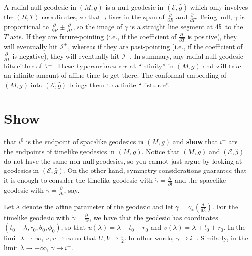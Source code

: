 \documentclass[10pt,a4paper]{exam}
\newcommand{\doit}[1]{{\color{darkgreen}\sffamily\bfseries #1}}
\newcommand{\pder}[2]{\frac{\partial #1}{\partial #2}}
\newcommand{\der}[2]{\frac{d #1}{d #2}}
\newcommand{\scri}{\mathscr{I}}
\newcommand{\esu}{\mathscr{E}}
\begin{document}
\begin{questions}
\begin{parts}
          \begin{solution}
            A radial null geodesic in $(M,g)$ is
            a null geodesic in $(\esu,\hat g)$ which only involves the
            $(R,T)$ coordinates, so that $\dot\gamma$ lives in the
            span of $\pder{~}{R}$ and $\pder{~}{T}$.  Being null,
            $\dot\gamma$ is proportional to $\pder{~}{R} \pm
            \pder{~}{T}$, so the image of $\gamma$ is a straight line
            segment at 45\textdegree\ to the $T$ axis.  If they
            are future-pointing (i.e., if the coefficient of
            $\pder{~}{T}$ is positive), they will eventually hit
            $\scri^+$, whereas if they are past-pointing (i.e., if the
            coefficient of $\pder{~}{T}$ is negative), they will
            eventually hit $\scri^-$.  In summary, any radial null
            geodesic hits either of $\scri^\pm$.  These hypersurfaces
            are at ``infinity'' in $(M,g)$ and will take an infinite
            amount of affine time to get there.  The conformal
            embedding of $(M,g)$ into $(\esu,\hat g)$ brings them to a
            finite ``distance''.
          \end{solution}

          
        \part \doit{Show} that $i^0$ is the endpoint of spacelike
          geodesics in $(M,g)$ and \doit{show} that $i^\pm$ are the
          endpoints of timelike geodesics in $(M,g)$.  Notice that
          $(M,g)$ and $(\esu,\hat g)$ do not have the same non-null
          geodesics, so you cannot just argue by looking at geodesics
          in $(\esu,\hat g)$.  On the other hand, symmetry
          considerations guarantee that it is enough to consider the
          timelike geodesic with $\dot\gamma = \pder{~}{t}$ and the
          spacelike geodesic with $\dot\gamma = \pder{~}{z}$, say.
        \end{parts}

        \begin{solution}
          Let $\lambda$ denote the affine parameter of the geodesic
          and let $\dot\gamma = \gamma_*(\der{~}{\lambda})$.  For the
          timelike geodesic with $\dot\gamma = \pder{~}{t}$, we have
          that the geodesic has coordinates $(t_0+ \lambda, r_0,
          \theta_0, \phi_0)$, so that $u(\lambda) = \lambda + t_0 -
          r_0$ and $v(\lambda) = \lambda + t_0 + r_0$.  In the limit
          $\lambda \to \infty$, $u,v \to \infty$ so that $U,V \to
          \tfrac\pi2$.  In other words, $\gamma \to i^+$.  Similarly,
          in the limit $\lambda \to -\infty$, $\gamma \to i^-$.


\end{solution}
\end{questions}
\end{document}
